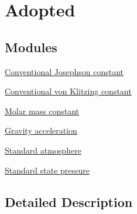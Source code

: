 \hypertarget{group___adopted}{}\section{Adopted}
\label{group___adopted}
\subsection*{Modules}
\begin{DoxyCompactItemize}
\item 
\hyperlink{group___conventional_josephson_constant}{Conventional Josephson constant}
\item 
\hyperlink{group___conventionalvon_klitzing_constant}{Conventional von Klitzing constant}
\item 
\hyperlink{group___molar_mass_constant}{Molar mass constant}
\item 
\hyperlink{group___gravity_acceleration}{Gravity acceleration}
\item 
\hyperlink{group___standard_atmosphere}{Standard atmosphere}
\item 
\hyperlink{group___standard_state_pressure}{Standard state pressure}
\end{DoxyCompactItemize}


\subsection{Detailed Description}
